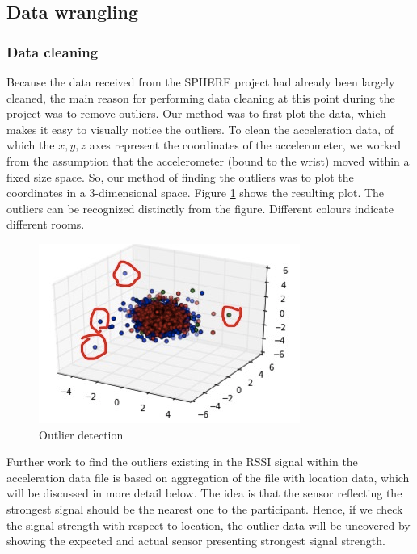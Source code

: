 \documentclass[fleqn,10pt]{SelfArx} %
\begin{document}
	\subsection{Data wrangling}
\subsubsection{Data cleaning}
Because the data received from the SPHERE project had already been largely cleaned, the main reason for performing data cleaning at this point during the project was to remove outliers. Our method was to first plot the data, which makes it easy to visually notice the outliers. To clean the acceleration data, of which the $ x, y, z $ axes represent the coordinates of the accelerometer, we worked from the assumption that the accelerometer (bound to the wrist) moved within a fixed size space. So, our method of finding the outliers was to plot the coordinates in a 3-dimensional space. Figure \ref{fig:outliers} shows the resulting plot. The outliers can be recognized distinctly from the figure. Different colours indicate different rooms. \\

\begin{figure}[!h] \centering
	\includegraphics[scale=0.5]{outliers} 
	\caption{Outlier detection}
	\label{fig:outliers}
\end{figure}

Further work to find the outliers existing in the RSSI signal within the acceleration data file is based on aggregation of the file with location data, which will be discussed in more detail below. The idea is that the sensor reflecting the strongest signal should be the nearest one to the participant. Hence, if we check the signal strength with respect to location, the outlier data will be uncovered by showing the expected and actual sensor presenting strongest signal strength. \\
\end{document}
